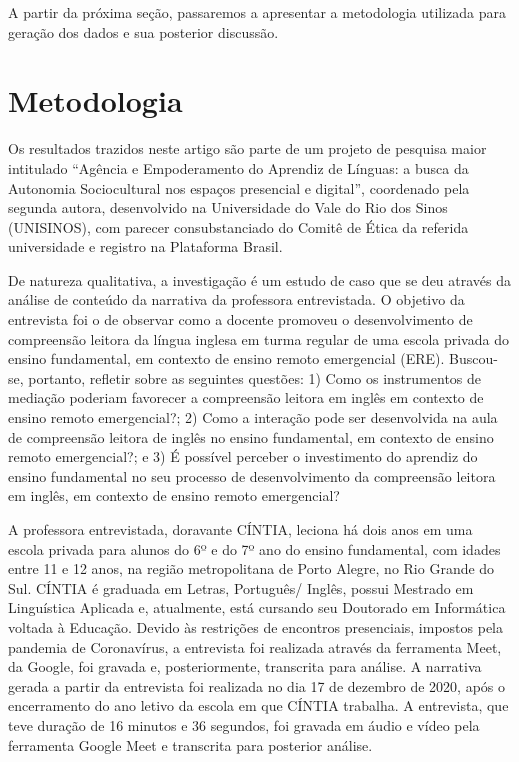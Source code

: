 \documentclass{textolivre}
\begin{document}
A partir da próxima seção, passaremos a apresentar a metodologia utilizada para geração dos dados e sua posterior discussão.

\section{Metodologia}
Os resultados trazidos neste artigo são parte de um projeto de pesquisa maior intitulado “Agência e Empoderamento do Aprendiz de Línguas: a busca da Autonomia Sociocultural nos espaços presencial e digital”, coordenado pela segunda autora, desenvolvido na Universidade do Vale do Rio dos Sinos (UNISINOS), com parecer consubstanciado do Comitê de Ética da referida universidade e registro na Plataforma Brasil.

De natureza qualitativa, a investigação é um estudo de caso que se deu através da análise de conteúdo da narrativa da professora entrevistada. O objetivo da entrevista foi o de observar como a docente promoveu o desenvolvimento de compreensão leitora da língua inglesa em turma regular de uma escola privada do ensino fundamental, em contexto de ensino remoto emergencial (ERE). Buscou-se, portanto, refletir sobre as seguintes questões: 1) Como os instrumentos de mediação \cite{swain_sociocultural_2015} poderiam favorecer a compreensão leitora em inglês em contexto de ensino remoto emergencial?; 2) Como a interação \cite{ellis2020, figueiredo2019} pode ser desenvolvida na aula de compreensão leitora de inglês no ensino fundamental, em contexto de ensino remoto emergencial?; e 3) É possível perceber o investimento \cite{darvin2016} do aprendiz do ensino fundamental no seu processo de desenvolvimento da compreensão leitora em inglês, em contexto de ensino remoto emergencial?

A professora entrevistada, doravante CÍNTIA, leciona há dois anos em uma escola privada para alunos do 6º e do 7º ano do ensino fundamental, com idades entre 11 e 12 anos, na região metropolitana de Porto Alegre, no Rio Grande do Sul. CÍNTIA é graduada em Letras, Português/ Inglês, possui Mestrado em Linguística Aplicada e, atualmente, está cursando seu Doutorado em Informática voltada à Educação. Devido às restrições de encontros presenciais, impostos pela pandemia de Coronavírus, a entrevista foi realizada através da ferramenta Meet, da Google, foi gravada e, posteriormente, transcrita para análise. A narrativa gerada a partir da entrevista foi realizada no dia 17 de dezembro de 2020, após o encerramento do ano letivo da escola em que CÍNTIA trabalha. A entrevista, que teve duração de 16 minutos e 36 segundos, foi gravada em áudio e vídeo pela ferramenta Google Meet e transcrita para posterior análise.
\end{document}

